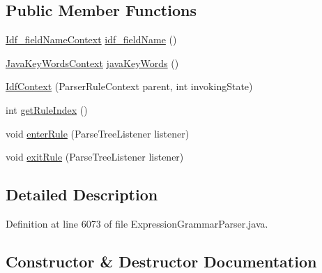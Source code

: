 \subsection*{Public Member Functions}
\begin{DoxyCompactItemize}
\item 
\hyperlink{classgov_1_1nasa_1_1jpf_1_1inspector_1_1server_1_1expression_1_1parser_1_1_expression_grammar_pad53202cd69742416986508e382be2265}{Idf\+\_\+field\+Name\+Context} \hyperlink{classgov_1_1nasa_1_1jpf_1_1inspector_1_1server_1_1expression_1_1parser_1_1_expression_grammar_parser_1_1_idf_context_ab8ae508887a499430f62fc613649283b}{idf\+\_\+field\+Name} ()
\item 
\hyperlink{classgov_1_1nasa_1_1jpf_1_1inspector_1_1server_1_1expression_1_1parser_1_1_expression_grammar_parser_1_1_java_key_words_context}{Java\+Key\+Words\+Context} \hyperlink{classgov_1_1nasa_1_1jpf_1_1inspector_1_1server_1_1expression_1_1parser_1_1_expression_grammar_parser_1_1_idf_context_a8678f560b5c2bfbe5eb381c0f568ed40}{java\+Key\+Words} ()
\item 
\hyperlink{classgov_1_1nasa_1_1jpf_1_1inspector_1_1server_1_1expression_1_1parser_1_1_expression_grammar_parser_1_1_idf_context_affb958d3e85175404ff46b4228023f3f}{Idf\+Context} (Parser\+Rule\+Context parent, int invoking\+State)
\item 
int \hyperlink{classgov_1_1nasa_1_1jpf_1_1inspector_1_1server_1_1expression_1_1parser_1_1_expression_grammar_parser_1_1_idf_context_ad3a42e9a0b2fc1d79f2f16820a4b0608}{get\+Rule\+Index} ()
\item 
void \hyperlink{classgov_1_1nasa_1_1jpf_1_1inspector_1_1server_1_1expression_1_1parser_1_1_expression_grammar_parser_1_1_idf_context_aeaada9330ff344f41270039188d15261}{enter\+Rule} (Parse\+Tree\+Listener listener)
\item 
void \hyperlink{classgov_1_1nasa_1_1jpf_1_1inspector_1_1server_1_1expression_1_1parser_1_1_expression_grammar_parser_1_1_idf_context_a90b39c396faa7d9753fcae2ec3d37c0c}{exit\+Rule} (Parse\+Tree\+Listener listener)
\end{DoxyCompactItemize}


\subsection{Detailed Description}


Definition at line 6073 of file Expression\+Grammar\+Parser.\+java.



\subsection{Constructor \& Destructor Documentation}
